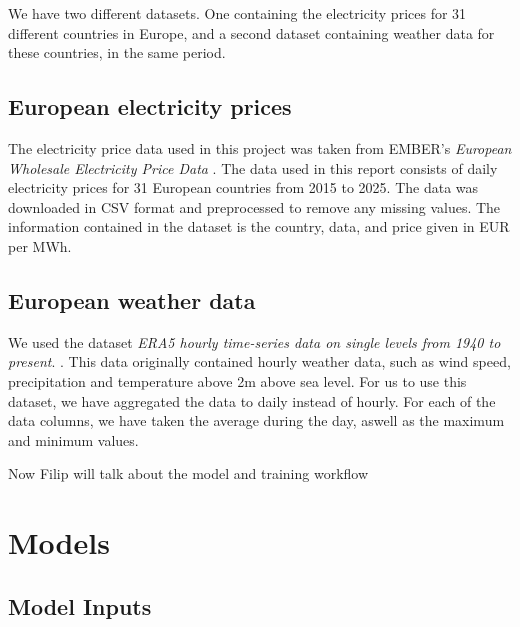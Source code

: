 \documentclass[12pt]{article}
\begin{document}
We have two different datasets. One containing the electricity prices for 31 different countries in Europe, and a second dataset containing weather data for these countries, in the same period. 

\subsection{European electricity prices}

The electricity price data used in this project was taken from EMBER's \textit{European Wholesale Electricity Price Data} \citep{ember2025}.  The data used in this report consists of daily electricity prices for 31 European countries from 2015 to 2025. The data was downloaded in CSV format and preprocessed to remove any missing values. The information contained in the dataset is the country, data, and price given in EUR per MWh. 

\subsection{European weather data}
We used the dataset \textit{ERA5 hourly time-series data on single levels from 1940 to present}. \citep{hersbach2025era5}. This data originally contained hourly weather data, such as wind speed, precipitation and temperature above 2m above sea level. For us to use this dataset, we have aggregated the data to daily instead of hourly. For each of the data columns, we have taken the average during the day, aswell as the maximum and minimum values. 

Now Filip will talk about the model and training workflow


 \clearpage




\section{Models}

\subsection*{Model Inputs}
\end{document}
